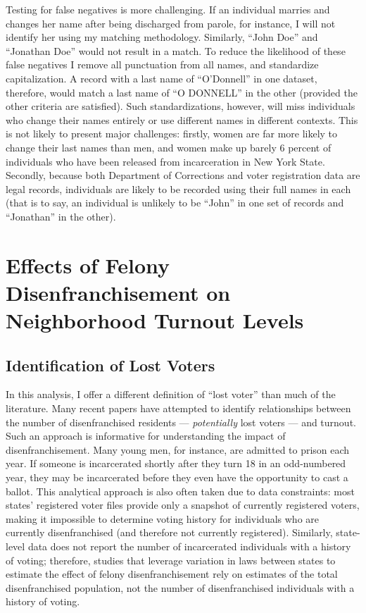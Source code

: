 \documentclass[12pt,]{article}
\begin{document}
Testing for false negatives is more challenging. If an individual marries and changes her name after being discharged from parole, for instance, I will not identify her using my matching methodology. Similarly, ``John Doe'' and ``Jonathan Doe'' would not result in a match. To reduce the likelihood of these false negatives I remove all punctuation from all names, and standardize capitalization. A record with a last name of ``O'Donnell'' in one dataset, therefore, would match a last name of ``O DONNELL'' in the other (provided the other criteria are satisfied). Such standardizations, however, will miss individuals who change their names entirely or use different names in different contexts. This is not likely to present major challenges: firstly, women are far more likely to change their last names than men, and women make up barely 6 percent of individuals who have been released from incarceration in New York State. Secondly, because both Department of Corrections and voter registration data are legal records, individuals are likely to be recorded using their full names in each (that is to say, an individual is unlikely to be ``John'' in one set of records and ``Jonathan'' in the other).

\hypertarget{effects-of-felony-disenfranchisement-on-neighborhood-turnout-levels}{%
\section{Effects of Felony Disenfranchisement on Neighborhood Turnout Levels}\label{effects-of-felony-disenfranchisement-on-neighborhood-turnout-levels}}

\hypertarget{identification-of-lost-voters}{%
\subsection*{Identification of Lost Voters}\label{identification-of-lost-voters}}

In this analysis, I offer a different definition of ``lost voter'' than much of the literature. Many recent papers have attempted to identify relationships between the number of disenfranchised residents --- \emph{potentially} lost voters --- and turnout. Such an approach is informative for understanding the impact of disenfranchisement. Many young men, for instance, are admitted to prison each year. If someone is incarcerated shortly after they turn 18 in an odd-numbered year, they may be incarcerated before they even have the opportunity to cast a ballot. This analytical approach is also often taken due to data constraints: most states' registered voter files provide only a snapshot of currently registered voters, making it impossible to determine voting history for individuals who are currently disenfranchised (and therefore not currently registered). Similarly, state-level data does not report the number of incarcerated individuals with a history of voting; therefore, studies that leverage variation in laws between states to estimate the effect of felony disenfranchisement rely on estimates of the total disenfranchised population, not the number of disenfranchised individuals with a history of voting.
\end{document}
